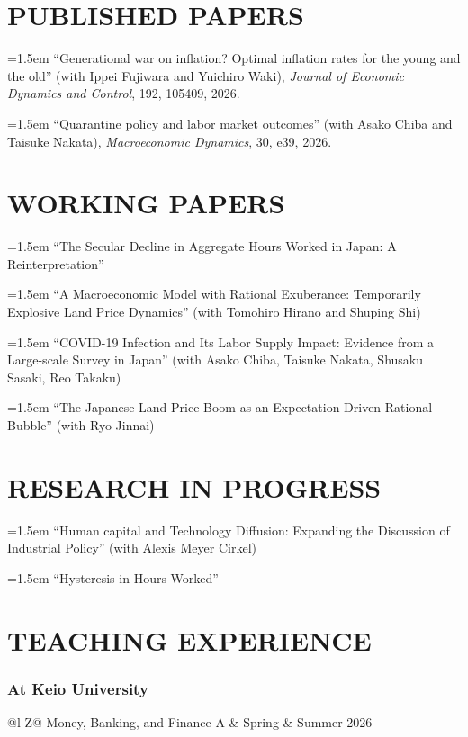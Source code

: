 \documentclass[12pt]{article}
\newcommand{\paperentry}[1]{\noindent\hangindent=1.5em\hangafter=1 #1\par}
\begin{document}
\section*{PUBLISHED PAPERS}
\paperentry{``Generational war on inflation? Optimal inflation rates for the young and the old'' (with Ippei Fujiwara and Yuichiro Waki), \textit{Journal of Economic Dynamics and Control}, 192, 105409, 2026.}
\paperentry{``Quarantine policy and labor market outcomes'' (with Asako Chiba and Taisuke Nakata), \textit{Macroeconomic Dynamics}, 30, e39, 2026.}

\vspace{1em}

\section*{WORKING PAPERS}
\paperentry{``The Secular Decline in Aggregate Hours Worked in Japan: A Reinterpretation''}
\paperentry{``A Macroeconomic Model with Rational Exuberance: Temporarily Explosive Land Price Dynamics'' (with Tomohiro Hirano and Shuping Shi)}
\paperentry{``COVID-19 Infection and Its Labor Supply Impact: Evidence from a Large-scale Survey in Japan'' (with Asako Chiba, Taisuke Nakata, Shusaku Sasaki, Reo Takaku)}
\paperentry{``The Japanese Land Price Boom as an Expectation-Driven Rational Bubble'' (with Ryo Jinnai)}

\section*{RESEARCH IN PROGRESS}
\paperentry{``Human capital and Technology Diffusion: Expanding the Discussion of Industrial Policy'' (with Alexis Meyer Cirkel)}
\paperentry{``Hysteresis in Hours Worked''}


\section*{TEACHING EXPERIENCE}
\subsubsection*{At Keio University}
\begin{tabularx}{\linewidth}{@{}l Z@{}}
Money, Banking, and Finance A & Spring \& Summer 2026\\
\end{tabularx}
\end{document}
